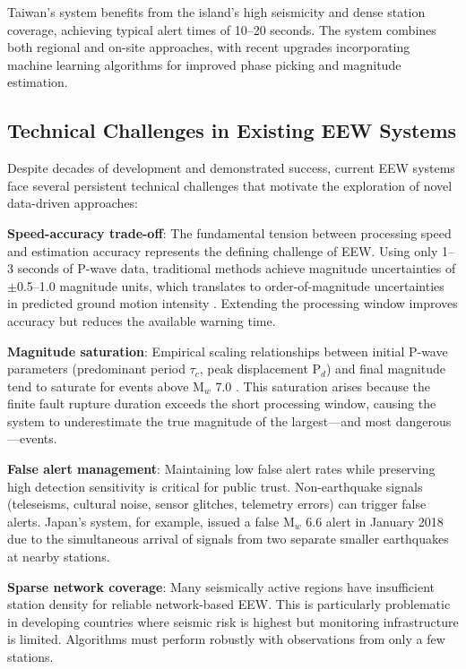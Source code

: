 \documentclass[review,authoryear]{elsarticle}
\begin{document}
Taiwan's system \citep{hsiao2009development, wu2005experiment} benefits from the island's high seismicity and dense station coverage, achieving typical alert times of 10--20 seconds. The system combines both regional and on-site approaches, with recent upgrades incorporating machine learning algorithms for improved phase picking and magnitude estimation.

\subsection{Technical Challenges in Existing EEW Systems}

Despite decades of development and demonstrated success, current EEW systems face several persistent technical challenges that motivate the exploration of novel data-driven approaches:

\textbf{Speed-accuracy trade-off}: The fundamental tension between processing speed and estimation accuracy represents the defining challenge of EEW. Using only 1--3 seconds of P-wave data, traditional methods achieve magnitude uncertainties of $\pm$0.5--1.0 magnitude units, which translates to order-of-magnitude uncertainties in predicted ground motion intensity \citep{satriano2011earthquake}. Extending the processing window improves accuracy but reduces the available warning time.

\textbf{Magnitude saturation}: Empirical scaling relationships between initial P-wave parameters (predominant period $\tau_c$, peak displacement P$_d$) and final magnitude tend to saturate for events above M$_w$ 7.0 \citep{wu2005experiment}. This saturation arises because the finite fault rupture duration exceeds the short processing window, causing the system to underestimate the true magnitude of the largest---and most dangerous---events.

\textbf{False alert management}: Maintaining low false alert rates while preserving high detection sensitivity is critical for public trust. Non-earthquake signals (teleseisms, cultural noise, sensor glitches, telemetry errors) can trigger false alerts. Japan's system, for example, issued a false M$_w$ 6.6 alert in January 2018 due to the simultaneous arrival of signals from two separate smaller earthquakes at nearby stations.

\textbf{Sparse network coverage}: Many seismically active regions have insufficient station density for reliable network-based EEW. This is particularly problematic in developing countries where seismic risk is highest but monitoring infrastructure is limited. Algorithms must perform robustly with observations from only a few stations.
\end{document}
